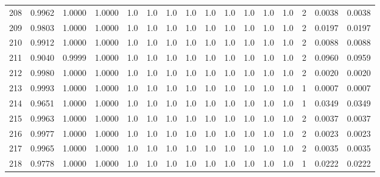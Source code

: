 \begin{tabular}{lrrrrrrrrrrrrrrr}
208 &      0.9962 &  1.0000 &  1.0000 &     1.0 &     1.0 &     1.0 &     1.0 &     1.0 &     1.0 &     1.0 &      1.0 &        1.0 &      2 &                    0.0038 &                     0.0038 \\
209 &      0.9803 &  1.0000 &  1.0000 &     1.0 &     1.0 &     1.0 &     1.0 &     1.0 &     1.0 &     1.0 &      1.0 &        1.0 &      2 &                    0.0197 &                     0.0197 \\
210 &      0.9912 &  1.0000 &  1.0000 &     1.0 &     1.0 &     1.0 &     1.0 &     1.0 &     1.0 &     1.0 &      1.0 &        1.0 &      2 &                    0.0088 &                     0.0088 \\
211 &      0.9040 &  0.9999 &  1.0000 &     1.0 &     1.0 &     1.0 &     1.0 &     1.0 &     1.0 &     1.0 &      1.0 &        1.0 &      2 &                    0.0960 &                     0.0959 \\
212 &      0.9980 &  1.0000 &  1.0000 &     1.0 &     1.0 &     1.0 &     1.0 &     1.0 &     1.0 &     1.0 &      1.0 &        1.0 &      2 &                    0.0020 &                     0.0020 \\
213 &      0.9993 &  1.0000 &  1.0000 &     1.0 &     1.0 &     1.0 &     1.0 &     1.0 &     1.0 &     1.0 &      1.0 &        1.0 &      1 &                    0.0007 &                     0.0007 \\
214 &      0.9651 &  1.0000 &  1.0000 &     1.0 &     1.0 &     1.0 &     1.0 &     1.0 &     1.0 &     1.0 &      1.0 &        1.0 &      1 &                    0.0349 &                     0.0349 \\
215 &      0.9963 &  1.0000 &  1.0000 &     1.0 &     1.0 &     1.0 &     1.0 &     1.0 &     1.0 &     1.0 &      1.0 &        1.0 &      2 &                    0.0037 &                     0.0037 \\
216 &      0.9977 &  1.0000 &  1.0000 &     1.0 &     1.0 &     1.0 &     1.0 &     1.0 &     1.0 &     1.0 &      1.0 &        1.0 &      2 &                    0.0023 &                     0.0023 \\
217 &      0.9965 &  1.0000 &  1.0000 &     1.0 &     1.0 &     1.0 &     1.0 &     1.0 &     1.0 &     1.0 &      1.0 &        1.0 &      2 &                    0.0035 &                     0.0035 \\
218 &      0.9778 &  1.0000 &  1.0000 &     1.0 &     1.0 &     1.0 &     1.0 &     1.0 &     1.0 &     1.0 &      1.0 &        1.0 &      1 &                    0.0222 &                     0.0222 \\

\end{tabular}
